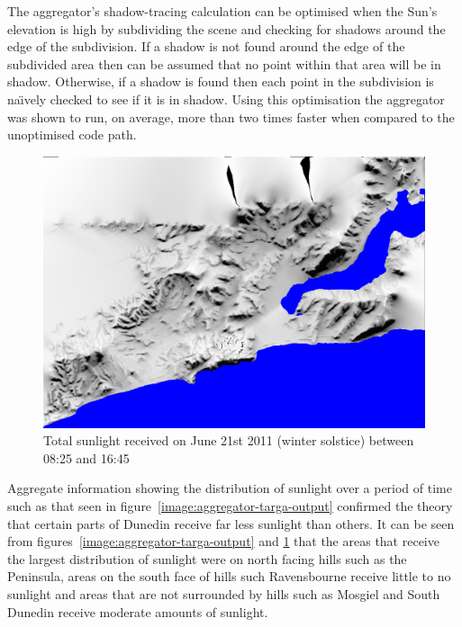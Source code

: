\documentclass[12pt]{report}
\newcommand{\note}[1]{}
\newcommand{\notedme}[1]{}
\begin{document}
The aggregator's shadow-tracing calculation can be optimised when the Sun's elevation is high by subdividing the scene and checking for shadows around the edge of the subdivision. If a shadow is not found around the edge of the subdivided area then can be assumed that no point within that area will be in shadow. Otherwise, if a shadow is found then each point in the subdivision is na\"{\i}vely checked to see if it is in shadow. Using this optimisation the aggregator was shown to run, on average, more than two times faster when compared to the unoptimised code path.\note{rewrote this part}

\begin{figure}[h]
\centering
\includegraphics[scale=0.25]{wintersolstice.png}
\caption{Total sunlight received on June 21st 2011 (winter solstice) between 08:25 and 16:45}
\label{image:wintersolstice}
\end{figure}

Aggregate information showing the distribution of sunlight over a period of time such as that seen in figure~\ref{image:aggregator-targa-output} confirmed the theory that certain parts of Dunedin receive far less sunlight than others. It can be seen from figures~\ref{image:aggregator-targa-output} and \ref{image:wintersolstice} that the areas that receive the largest distribution of sunlight were on north facing hills such as the Peninsula, areas on the south face of hills such Ravensbourne receive little to no sunlight and areas that are not surrounded by hills such as Mosgiel and South Dunedin receive moderate amounts of sunlight.\notedme{figure references are broken in this paragraph (they shouldn't all be the same)}\note{oops didn't notice this when I was changing some images around}



\end{document}
